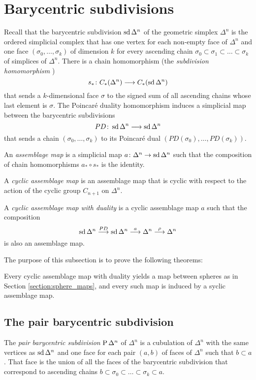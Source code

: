 \section{Barycentric subdivisions} Recall that the barycentric subdivision $\operatorname{sd} \Delta^n$ of the geometric simplex $\Delta^n$ is the ordered simplicial complex that has one vertex for each non-empty face of $\Delta^n$ and one face $(\sigma_0,\ldots,\sigma_k)$ of dimension $k$ for every ascending chain $\sigma_0\subset \sigma_1\subset\ldots \subset \sigma_k$ of simplices of $\Delta^n$. There is a chain homomorphism (the \emph{subdivision homomorphism} \cite[\P 1.12]{NR})
\[
    s_*\colon C_*(\Delta^n)\longrightarrow C_*(\operatorname{sd} \Delta^n)
\]
that sends a $k$-dimensional face $\sigma$ to the signed sum of all ascending chains whose last element is $\sigma$. The Poincaré duality homomorphism induces a simplicial map between the barycentric subdivisions
\[PD\colon \operatorname{sd} \Delta^n\longrightarrow \operatorname{sd} \Delta^n\]
that sends a chain $(\sigma_0,\ldots,\sigma_k)$ to its Poincaré dual $(PD(\sigma_0),\ldots,PD(\sigma_k))$.
\begin{definition}
    An \emph{assemblage map} is a simplicial map $a\colon \Delta^n\to \operatorname{sd} \Delta^n$ such that the composition of chain homomorphisms $a_*\circ s_*$ is the identity.
\end{definition}
\begin{definition}
    A \emph{cyclic assemblage map} is an assemblage map that is cyclic with respect to the action of the cyclic group $C_{n+1}$ on $\Delta^n$.
\end{definition}
\begin{definition}
    A \emph{cyclic assemblage map with duality} is a cyclic assemblage map $a$ such that the composition
    \[\operatorname{sd} \Delta^n \overset{PD}{\longrightarrow} \operatorname{sd} \Delta^n \overset{a}{\longrightarrow} \Delta^n\overset{\rho}{\longrightarrow} \Delta^n \]
    is also an assemblage map.
\end{definition}
The purpose of this subsection is to prove the following theorems:
\begin{theorem}
    Every cyclic assemblage map with duality yields a map between spheres as in Section \ref{section:sphere_maps}, and every such map is induced by a syclic assemblage map.
\end{theorem}

\subsection{The pair barycentric subdivision} The \emph{pair barycentric subdivision} $\operatorname{P} \Delta^n$ of $\Delta^n$ is a cubulation of $\Delta^n$ with the same vertices as $\operatorname{sd} \Delta^n$ and one face for each pair $(a,b)$ of faces of $\Delta^n$ such that $b\subset a$. That face is the union of all the faces of the barycentric subdivision that correspond to ascending chains $b\subset \sigma_0\subset \ldots\subset \sigma_k\subset a$.

